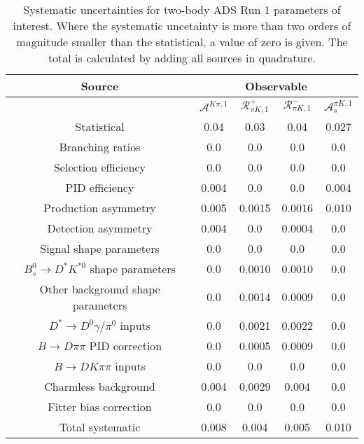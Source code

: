 \begin{sidewaystable}
  \centering
  \begin{tabular}{ccccc}
      \toprule
      Source & \multicolumn{4}{c}{Observable} \\
      \midrule
       & $\mathcal{A}^{K\pi,1}$ & $\mathcal{R}_{\pi K,1}^+$ & $\mathcal{R}_{\pi K,1}^-$ & $\mathcal{A}_s^{\pi K,1}$ \\
      \midrule
      Statistical & 0.04 & 0.03 & 0.04 & 0.027 \\
      \midrule
      Branching ratios & 0.0  & 0.0  & 0.0  & 0.0  \\
      Selection efficiency & 0.0  & 0.0  & 0.0  & 0.0  \\
      PID efficiency & 0.004 & 0.0  & 0.0  & 0.004 \\
      Production asymmetry & 0.005 & 0.0015 & 0.0016 & 0.010 \\
      Detection asymmetry & 0.004 & 0.0  & 0.0004 & 0.0  \\
      Signal shape parameters & 0.0  & 0.0  & 0.0  & 0.0  \\
      $B^0_s \to D^* K^{*0}$ shape parameters & 0.0  & 0.0010 & 0.0010 & 0.0  \\
      Other background shape parameters & 0.0  & 0.0014 & 0.0009 & 0.0  \\
      $D^* \to D^0 \gamma/\pi^0$ inputs & 0.0  & 0.0021 & 0.0022 & 0.0  \\
      $B\to D\pi\pi$ PID correction & 0.0  & 0.0005 & 0.0009 & 0.0  \\
      $B\to DK\pi\pi$ inputs & 0.0  & 0.0  & 0.0  & 0.0  \\
      Charmless background & 0.004 & 0.0029 & 0.004 & 0.0  \\
      Fitter bias correction & 0.0  & 0.0  & 0.0  & 0.0  \\
      \midrule
      Total systematic & 0.008 & 0.004 & 0.005 & 0.010 \\
      \bottomrule
  \end{tabular}
  \caption{Systematic uncertainties for two-body ADS Run 1 parameters of interest. Where the systematic uncetainty is more than two orders of magnitude smaller than the statistical, a value of zero is given. The total is calculated by adding all sources in quadrature.}
\label{tab:twoBody_ADS_run1_systematics}
\end{sidewaystable}
